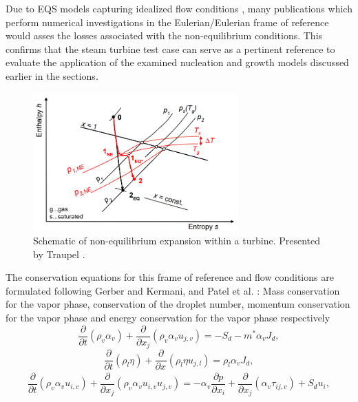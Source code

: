 \documentclass[12pt]{article}
\numberwithin{equation}{section}
\begin{document}
Due to EQS models capturing idealized flow conditions \cite{starzmann2010non}, many publications which perform numerical investigations in the Eulerian/Eulerian frame of reference would asses the losses associated with the non-equilibrium conditions. This confirms that the steam turbine test case can serve as a pertinent reference to evaluate the application of the examined nucleation and growth models discussed earlier in the sections.
\begin{figure}[H]
    \centering
    \includegraphics[width=0.7\textwidth]{Figures/NES_h_s.png}
    \caption{Schematic of non-equilibrium expansion within a turbine. Presented by Traupel \cite{traupel1977thermal}.}
    \label{f:NES}
\end{figure}
The conservation equations for this frame of reference and flow conditions are formulated following Gerber and Kermani, and Patel et al. \cite{gerber2004pressure,patel2016influence}:
Mass conservation for the vapor phase, conservation of the droplet number, momentum conservation for the vapor phase and energy conservation for the vapor phase respectively 
\begin{equation}
    \frac{\partial}{\partial t}(\rho_{v}\alpha_{v})+\frac{\partial}{\partial x_{j}}(\rho_{v}\alpha_{v}u_{j,v}) = - S_{d}- m^{*}\alpha_{v}J_{d},  
    \label{eq:v_conti}
\end{equation}
\begin{equation}
     \frac{\partial}{\partial t}(\rho_{l}\eta)+\frac{\partial}{\partial x_{}}(\rho_{l}\eta u_{j,l}) = \rho_{l}\alpha_{v}J_{d},  
    \label{eq:number_conti}
\end{equation}
\begin{equation}
    \frac{\partial}{\partial t}(\rho_{v}\alpha_{v}u_{i,v})+\frac{\partial}{\partial x_{j}}(\rho_{v}\alpha_{v}u_{i,v}u_{j,v}) = -\alpha_{v}\frac{\partial p}{\partial x_{i}}+\frac{\partial}{\partial x_{j}}(\alpha_{v}\tau_{ij,v}) + S_{d}u_{i}, 
    \label{eq:v_momentum}
\end{equation}
\end{document}

